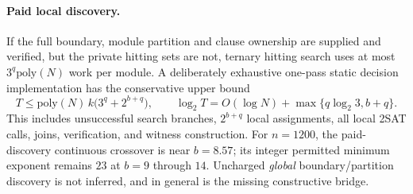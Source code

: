 \documentclass[11pt]{article}
\begin{document}
\paragraph{Paid local discovery.} If the full boundary, module partition and clause ownership are supplied and verified, but the private hitting sets are not, ternary hitting search uses at most $3^q\mathrm{poly}(N)$ work per module. A deliberately exhaustive one-pass static decision implementation has the conservative upper bound
\[
 T\le \mathrm{poly}(N)\,k\bigl(3^q+2^{b+q}\bigr),\qquad
 \log_2 T=O(\log N)+\max\{q\log_2 3,b+q\}.
\]
This includes unsuccessful search branches, $2^{b+q}$ local assignments, all local 2SAT calls, joins, verification, and witness construction. For $n=1200$, the paid-discovery continuous crossover is near $b=8.57$; its integer permitted minimum exponent remains $23$ at $b=9$ through $14$. Uncharged \emph{global} boundary/partition discovery is not inferred, and in general is the missing constructive bridge.
\end{document}
